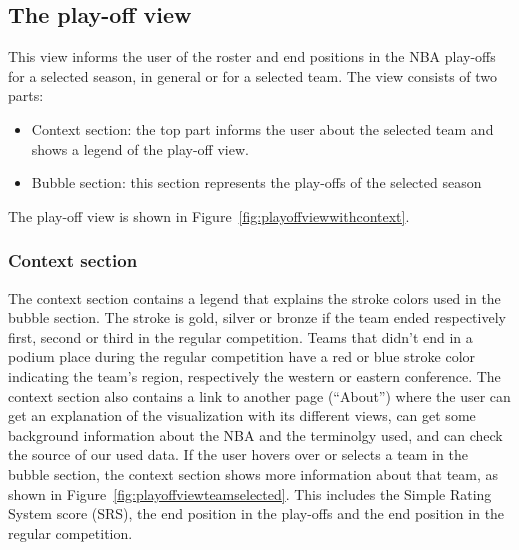 \documentclass{sigchi}
\begin{document}
\subsection{The play-off view}
This view informs the user of the roster and end positions in the NBA play-offs for a selected season, in general or for a selected team. The view consists of two parts: 
\begin{itemize}
    \item Context section: the top part informs the user about the selected team and shows a legend of the play-off view.
    \item Bubble section: this section represents the play-offs of the selected season
\end{itemize}
The play-off view is shown in Figure~\ref{fig:playoffviewwithcontext}.

\subsubsection{Context section}
The context section contains a legend that explains the stroke colors used in the bubble section. The stroke is gold, silver or bronze if the team ended respectively first, second or third in the regular competition. Teams that didn't end in a podium place during the regular competition have a red or blue stroke color indicating the team's region, respectively the western or eastern conference. The context section also contains a link to another page (``About'') where the user can get an explanation of the visualization with its different views, can get some background information about the NBA and the terminolgy used, and can check the source of our used data. If the user hovers over or selects a team in the bubble section, the context section shows more information about that team, as shown in Figure~\ref{fig:playoffviewteamselected}. This includes the Simple Rating System score (SRS), the end position in the play-offs and the end position in the regular competition.
\end{document}
